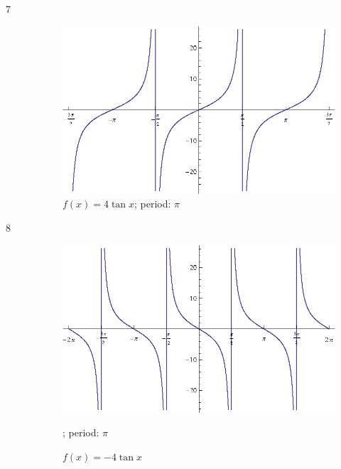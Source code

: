 \documentclass{exam}
\begin{document}
    \begin{description}

      \item[7]
        
        \begin{figure}[H]
          \centering
          \includegraphics[scale=0.9]{exercise07.eps}
          \caption{$f(x) = 4 \tan x$; period: $\pi$}
        \end{figure}

      \item[8]
        \begin{figure}[H]
          \centering
          \includegraphics[scale=0.9]{exercise08.eps}
          \caption{$f(x) = -4 \tan x$}; period: $\pi$
        \end{figure}


\end{description}
\end{document}
